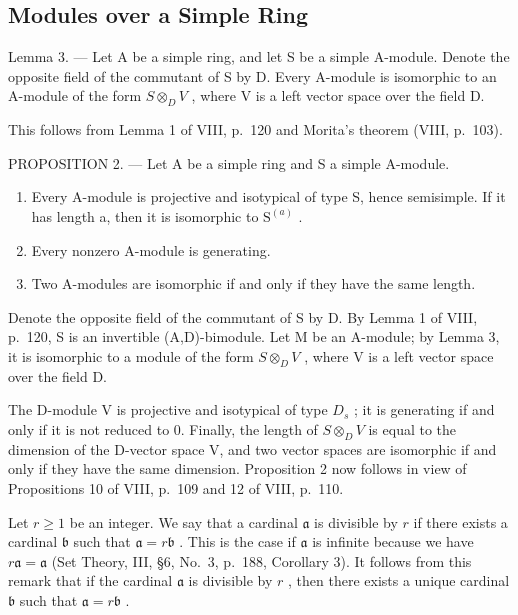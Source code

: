 \subsection{Modules over a Simple Ring}

Lemma 3. --- Let A be a simple ring, and let S be a simple A-module. Denote the opposite field of the commutant of S by D. Every A-module is isomorphic to an A-module of the form \(S \otimes_{D} V\) , where V is a left vector space over the field D.

This follows from Lemma 1 of VIII, p.~120 and Morita's theorem (VIII, p.~103).

PROPOSITION 2. --- Let A be a simple ring and S a simple A-module.

\begin{enumerate}
\def\labelenumi{\alph{enumi})}
\item
  Every A-module is projective and isotypical of type S, hence semisimple. If it has length a, then it is isomorphic to \(\mathrm{S}^{(a)}\) .
\item
  Every nonzero A-module is generating.
\item
  Two A-modules are isomorphic if and only if they have the same length.
\end{enumerate}

Denote the opposite field of the commutant of S by D. By Lemma 1 of VIII, p.~120, S is an invertible (A,D)-bimodule. Let M be an A-module; by Lemma 3, it is isomorphic to a module of the form \(S \otimes_{D} V\) , where V is a left vector space over the field D.

The D-module V is projective and isotypical of type \(D_{s}\) ; it is generating if and only if it is not reduced to 0. Finally, the length of \(S \otimes_{D} V\) is equal to the dimension of the D-vector space V, and two vector spaces are isomorphic if and only if they have the same dimension. Proposition 2 now follows in view of Propositions 10 of VIII, p.~109 and 12 of VIII, p.~110.

Let \(r \geqslant 1\) be an integer. We say that a cardinal \(\mathfrak{a}\) is divisible by \(r\) if there exists a cardinal \(\mathfrak{b}\) such that \(\mathfrak{a} = r\mathfrak{b}\) . This is the case if \(\mathfrak{a}\) is infinite because we have \(r\mathfrak{a} = \mathfrak{a}\) (Set Theory, III, §6, No.~3, p.~188, Corollary 3). It follows from this remark that if the cardinal \(\mathfrak{a}\) is divisible by \(r\) , then there exists a unique cardinal \(\mathfrak{b}\) such that \(\mathfrak{a} = r\mathfrak{b}\) .

